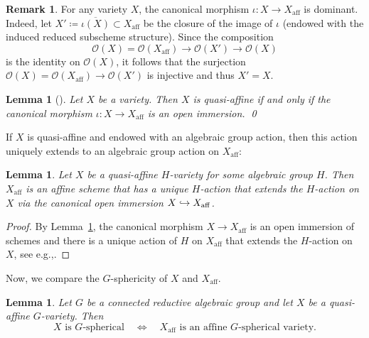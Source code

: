 \documentclass[11pt]{article}
\newcommand{\eg}{e.g.,\xspace}
\numberwithin{equation}{section}
\let\mathcal\mathscr
\def\hto{\mathrel{\lhook\joinrel\to}}
\theoremstyle{plain}
\newtheorem{lemma}[theorem]{Lemma}
\theoremstyle{definition}
\newtheorem{remark}[theorem]{Remark}
\DeclareMathOperator{\aff}{aff}
\newcommand{\OO}{\mathcal{O}}
\begin{document}
\begin{remark}
\label{rem.canonical_morphi_dominant}
For any variety $X$, the
canonical morphism $\iota \colon X \to X_{\aff}$ is dominant. Indeed, let
$X' \coloneqq \overline{\iota(X)} \subset X_{\aff}$ be the closure of the image of $\iota$
(endowed with the induced reduced subscheme structure).
Since the composition
\[
\OO(X) = \OO(X_{\aff}) \to \OO(X') \to \OO(X)
\]
is the identity on $\OO(X)$, it follows that the surjection $\OO(X)= \OO(X_{\aff}) \to \OO(X')$
is injective and thus $X' = X$.
\end{remark}

\begin{lemma}[{\cite[\S5, Prop.\,5.1.2]{Gr1961Elements-de-geomet-II}}]
\label{lem:Quasi-affine_irreducible}
Let $X$ be a variety. Then $X$ is quasi-affine if and only if the canonical morphism
$\iota \colon X \to X_{\aff}$ is an open immersion. \qed
\end{lemma}

If $X$ is quasi-affine and endowed with an algebraic group action, then this
action uniquely extends to an algebraic group action on $X_{\aff}$:

\begin{lemma}
\label{lem:Quasi-affine_group_action}
Let $X$ be a quasi-affine $H$-variety for some algebraic group $H$.
Then $X_{\aff}$ is an affine scheme that has a unique
$H$-action that extends the $H$-action on $X$ via the canonical open immersion
$X \hto X_{\aff}$.
\end{lemma}

\begin{proof}
By Lemma~\ref{lem:Quasi-affine_irreducible},
the canonical morphism $X \to X_{\aff}$
is an open immersion of schemes
and there is a unique action of $H$ on $X_{\aff}$ that extends the $H$-action on $X$, see
\eg \cite[Lem.\,5]{KrReSa2018Is-the-affine-spac}.
\end{proof}

Now, we compare the $G$-sphericity of $X$ and $X_{\aff}$.

\begin{lemma}
\label{lem:Spherical_quasi-affine}
Let $G$ be a connected reductive algebraic group and
let $X$ be a quasi-affine $G$-variety. Then
\[
\textrm{$X$ is $G$-spherical} \quad \iff \quad
\textrm{$X_{\aff}$ is an affine $G$-spherical variety}.
\]
\end{lemma}
\end{document}
